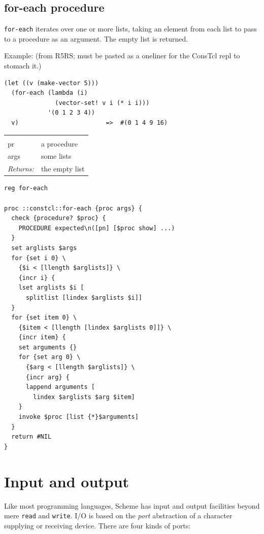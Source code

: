 \documentclass[twoside]{report}
\begin{document}
\subsection{for-each procedure}
\label{foreach-procedure}

\texttt{for-each} iterates over one or more lists, taking an element from each list to pass to a procedure as an argument. The empty list is returned.

Example: (from R5RS; must be pasted as a oneliner for the ConsTcl repl to stomach it.)

\begin{verbatim}
(let ((v (make-vector 5)))
  (for-each (lambda (i)
              (vector-set! v i (* i i)))
            '(0 1 2 3 4))
  v)                        =>  #(0 1 4 9 16)
\end{verbatim}

\noindent\begin{tabular}{ |p{1.9cm} p{8cm}| }
\hline
\rowcolor[HTML]{CCCCCC} \multicolumn{2}{|l|}{\bf for-each (public)} \\
pr & a procedure \\
args & some lists \\
\textit{Returns:} & the empty list \\
\hline
\end{tabular}

\begin{lstlisting}
reg for-each

proc ::constcl::for-each {proc args} {
  check {procedure? $proc} {
    PROCEDURE expected\n([pn] [$proc show] ...)
  }
  set arglists $args
  for {set i 0} \
    {$i < [llength $arglists]} \
    {incr i} {
    lset arglists $i [
      splitlist [lindex $arglists $i]]
  }
  for {set item 0} \
    {$item < [llength [lindex $arglists 0]]} \
    {incr item} {
    set arguments {}
    for {set arg 0} \
      {$arg < [llength $arglists]} \
      {incr arg} {
      lappend arguments [
        lindex $arglists $arg $item]
    }
    invoke $proc [list {*}$arguments]
  }
  return #NIL
}
\end{lstlisting}

\section{Input and output}
\label{input-and-output}

Like most programming languages, Scheme has input and output facilities beyond mere \texttt{read} and \texttt{write}. I/O is based on the \emph{port} abstraction of a character supplying or receiving device. There are four kinds of ports:
\end{document}
